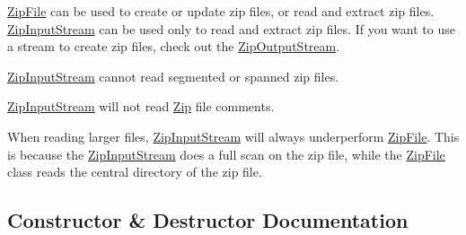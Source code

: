 \begin{DoxyItemize}
\item {\ttfamily \mbox{\hyperlink{class_super_tiled2_unity_1_1_ionic_1_1_zip_1_1_zip_file}{Zip\+File}}} can be used to create or update zip files, or read and extract zip files. {\ttfamily \mbox{\hyperlink{class_super_tiled2_unity_1_1_ionic_1_1_zip_1_1_zip_input_stream}{Zip\+Input\+Stream}}} can be used only to read and extract zip files. If you want to use a stream to create zip files, check out the \mbox{\hyperlink{class_super_tiled2_unity_1_1_ionic_1_1_zip_1_1_zip_output_stream}{Zip\+Output\+Stream}}. 


\item {\ttfamily \mbox{\hyperlink{class_super_tiled2_unity_1_1_ionic_1_1_zip_1_1_zip_input_stream}{Zip\+Input\+Stream}}} cannot read segmented or spanned zip files. 


\item {\ttfamily \mbox{\hyperlink{class_super_tiled2_unity_1_1_ionic_1_1_zip_1_1_zip_input_stream}{Zip\+Input\+Stream}}} will not read \mbox{\hyperlink{namespace_super_tiled2_unity_1_1_ionic_1_1_zip}{Zip}} file comments. 


\item When reading larger files, {\ttfamily \mbox{\hyperlink{class_super_tiled2_unity_1_1_ionic_1_1_zip_1_1_zip_input_stream}{Zip\+Input\+Stream}}} will always underperform {\ttfamily \mbox{\hyperlink{class_super_tiled2_unity_1_1_ionic_1_1_zip_1_1_zip_file}{Zip\+File}}}. This is because the {\ttfamily \mbox{\hyperlink{class_super_tiled2_unity_1_1_ionic_1_1_zip_1_1_zip_input_stream}{Zip\+Input\+Stream}}} does a full scan on the zip file, while the {\ttfamily \mbox{\hyperlink{class_super_tiled2_unity_1_1_ionic_1_1_zip_1_1_zip_file}{Zip\+File}}} class reads the central directory of the zip file. 


\end{DoxyItemize}

\subsection{Constructor \& Destructor Documentation}
\mbox{\label{class_super_tiled2_unity_1_1_ionic_1_1_zip_1_1_zip_input_stream_af9203130f058abb23317725bcb98c047}} 

